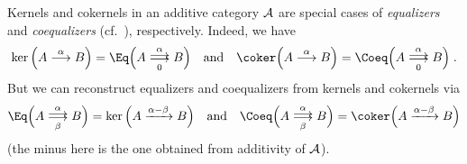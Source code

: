 \documentclass[a4paper,parskip=half,numbers=enddot, DIV=12]{scrreprt}
\begin{document}
	
\begin{rem}
	Kernels and cokernels in an additive category $\mathcal{A}$ are special cases of \emph{equalizers} and \emph{coequalizers} (cf.\ \cite[Definition~A.3.2 and Definition~A.3.4]{alggeo1}), respectively. Indeed, we have
	\begin{align*}
		\ker\Big(A\morphism[\alpha]B\Big)=\Eq\Big(A\doublemorphism[\alpha][0]B\Big)\quad\text{and}\quad\coker\Big(A\morphism[\alpha]B\Big)=\Coeq\Big(A\doublemorphism[\alpha][0]B\Big)\;. 
	\end{align*}
	But we can reconstruct equalizers and coequalizers from kernels and cokernels via
	\begin{align*}
		\Eq\Big(A\doublemorphism[\alpha][\beta]B\Big)=\ker\Big(A\xrightarrow{\alpha-\beta}B\Big)\quad\text{and}\quad \Coeq\Big(A\doublemorphism[\alpha][\beta]B\Big)=\coker\Big(A\xrightarrow{\alpha-\beta}B\Big)
	\end{align*}
	(the minus here is the one obtained from additivity of $\mathcal{A}$).
	

\end{rem}
\end{document}
